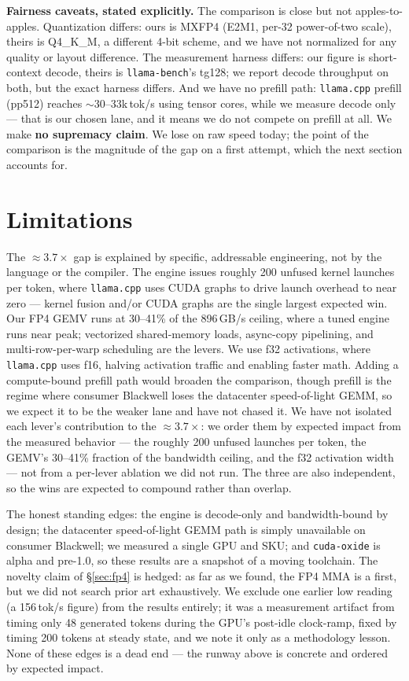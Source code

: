 \documentclass[11pt]{article}
\begin{document}
\textbf{Fairness caveats, stated explicitly.} The comparison is close but not apples-to-apples. Quantization differs: ours is MXFP4 (E2M1, per-32 power-of-two scale), theirs is Q4\_K\_M, a different 4-bit scheme, and we have not normalized for any quality or layout difference. The measurement harness differs: our figure is short-context decode, theirs is \texttt{llama-bench}'s tg128; we report decode throughput on both, but the exact harness differs. And we have no prefill path: \texttt{llama.cpp} prefill (pp512) reaches $\sim$30--33k\,tok/s using tensor cores, while we measure decode only --- that is our chosen lane, and it means we do not compete on prefill at all. We make \textbf{no supremacy claim}. We lose on raw speed today; the point of the comparison is the magnitude of the gap on a first attempt, which the next section accounts for.

\section{Limitations}
The $\approx\!3.7\times$ gap is explained by specific, addressable engineering, not by the language or the compiler. The engine issues roughly 200 unfused kernel launches per token, where \texttt{llama.cpp} uses CUDA graphs to drive launch overhead to near zero --- kernel fusion and/or CUDA graphs are the single largest expected win. Our FP4 GEMV runs at 30--41\% of the 896\,GB/s ceiling, where a tuned engine runs near peak; vectorized shared-memory loads, async-copy pipelining, and multi-row-per-warp scheduling are the levers. We use f32 activations, where \texttt{llama.cpp} uses f16, halving activation traffic and enabling faster math. Adding a compute-bound prefill path would broaden the comparison, though prefill is the regime where consumer Blackwell loses the datacenter speed-of-light GEMM, so we expect it to be the weaker lane and have not chased it. We have not isolated each lever's contribution to the $\approx\!3.7\times$: we order them by expected impact from the measured behavior --- the roughly 200 unfused launches per token, the GEMV's 30--41\% fraction of the bandwidth ceiling, and the f32 activation width --- not from a per-lever ablation we did not run. The three are also independent, so the wins are expected to compound rather than overlap.

The honest standing edges: the engine is decode-only and bandwidth-bound by design; the datacenter speed-of-light GEMM path is simply unavailable on consumer Blackwell; we measured a single GPU and SKU; and \texttt{cuda-oxide} is alpha and pre-1.0, so these results are a snapshot of a moving toolchain. The novelty claim of \S\ref{sec:fp4} is hedged: as far as we found, the FP4 MMA is a first, but we did not search prior art exhaustively. We exclude one earlier low reading (a 156\,tok/s figure) from the results entirely; it was a measurement artifact from timing only 48 generated tokens during the GPU's post-idle clock-ramp, fixed by timing 200 tokens at steady state, and we note it only as a methodology lesson. None of these edges is a dead end --- the runway above is concrete and ordered by expected impact.
\end{document}
